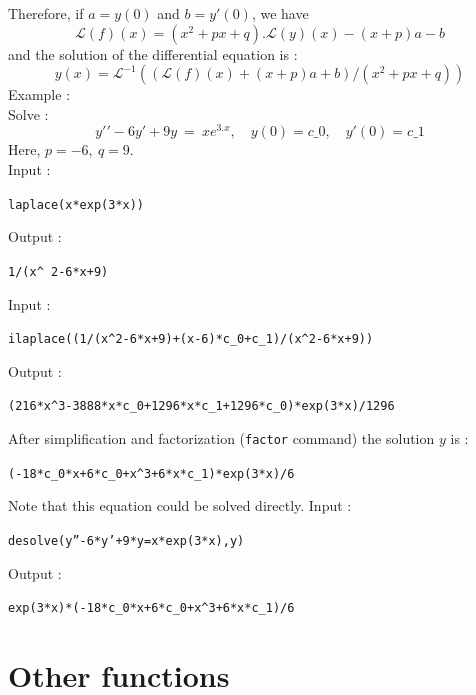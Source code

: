 \documentclass[a4paper,11pt]{book}
\begin{document}
Therefore, if $a=y(0)$ and $b=y'(0)$, we have
$${\mathcal{L}}(f)(x)=(x^2+p x+q).{\mathcal{L}}(y)(x)-(x+p) a-b$$
and the solution of the differential equation is :
\[ y(x)=
{\mathcal{L}}^{-1}(({\mathcal{L}}(f)(x)+(x+p) a +b)/(x^2+p x+q))
\]
Example :\\
Solve :
\[ y\prime \prime -6 y\prime+9 y \ =\ x e^{3. x},
\quad  y(0)=c\_0, \quad y\prime(0)=c\_1
\]
Here, $p=-6,\ q=9$.\\
Input :
\begin{center}{\tt laplace(x*exp(3*x))}\end{center}
Output :
\begin{center}{\tt 1/(x\verb|^| 2-6*x+9)}\end{center}
Input :
\begin{center}{\tt ilaplace((1/(x\verb|^|2-6*x+9)+(x-6)*c\_0+c\_1)/(x\verb|^|2-6*x+9))}\end{center}
Output :
\begin{center}{\tt (216*x\verb|^|3-3888*x*c\_0+1296*x*c\_1+1296*c\_0)*exp(3*x)/1296}\end{center}
After simplification and factorization ({\tt factor} command) 
the solution $y$ is :
\begin{center}{\tt (-18*c\_0*x+6*c\_0+x\verb|^|3+6*x*c\_1)*exp(3*x)/6}\end{center}
Note that this equation could be solved directly.
Input :
\begin{center}{\tt desolve(y''-6*y'+9*y=x*exp(3*x),y)}\end{center}
Output :
\begin{center}{\tt exp(3*x)*(-18*c\_0*x+6*c\_0+x\verb|^|3+6*x*c\_1)/6}\end{center}

\section{Other functions}
\end{document}
